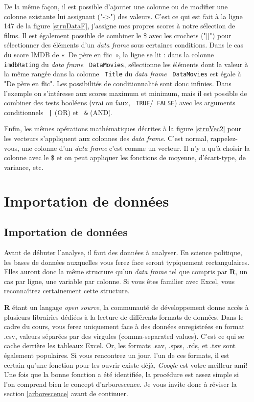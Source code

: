 \documentclass[10.5pt,a4paper]{article}
\newcommand{\rcode}[1]{\texttt{\color{rstudio} #1}}
\begin{document}
    
    De la même façon, il est possible d'ajouter une colonne ou de modifier une colonne existante lui assignant ("->") des valeurs. C'est ce qui est fait à la ligne 147 de la figure \ref{struDataF}, j'assigne mes propres scores à notre sélection de films. Il est également possible de combiner le \$ avec les crochets ("[]") pour sélectionner des éléments d'un \emph{data frame} sous certaines conditions. Dans le cas du score IMDB de «~De père en flic~», la ligne se lit : dans la colonne \rcode{imdbRating} du \emph{data frame} \rcode{DataMovies}, sélectionne les éléments dont la valeur à la même rangée dans la colonne \rcode{Title} du \emph{data frame} \rcode{DataMovies} est égale à "De père en flic". Les possibilités de conditionnalité sont donc infinies. Dans l'exemple on s'intéresse aux scores maximum et minimum, mais il est possible de combiner des tests booléens (vrai ou faux, \rcode{TRUE}/\rcode{FALSE}) avec les arguments conditionnels \rcode{|} (OR) et \rcode{\&} (AND). 
    
    Enfin, les mêmes opérations mathématiques décrites à la figure \ref{struVec2} pour les vecteurs s'appliquent aux colonnes des \emph{data frame}. C'est normal, rappelez-vous, une colonne d'un \emph{data frame} c'est comme un vecteur. Il n'y a qu'à choisir la colonne avec le \$ et on peut appliquer les fonctions de moyenne, d'écart-type, de variance, etc.

  
\section{Importation de données}\label{import}
  \subsection{Importation de données}
  Avant de débuter l'analyse, il faut des données à analyser. En science politique, les bases de données auxquelles vous ferez face seront typiquement rectangulaires. Elles auront donc la même structure qu'un \emph{data frame} tel que compris par \textbf{R}, un cas par ligne, une variable par colonne. Si vous êtes familier avec Excel, vous reconnaîtrez certainement cette structure. 
  
  \textbf{R} étant un langage \emph{open source}, la communauté de développement donne accès à plusieurs librairies dédiées à la lecture de différents formats de données. Dans le cadre du cours, vous ferez uniquement face à des données enregistrées en format .csv, valeurs séparées par des virgules (comma-separated values). C'est ce qui se cache derrière les tableaux Excel. Or, les formats .sav, .spss, .rds, et .tsv sont également populaires. Si vous rencontrez un jour, l'un de ces formats, il est certain qu'une fonction pour les ouvrir existe déjà, \emph{Google} est votre meilleur ami! Une fois que la bonne fonction a été identifiée, la procédure est assez simple si l'on comprend bien le concept d'arborescence. Je vous invite donc à réviser la section \ref{arborescence} avant de continuer. 
  
\end{document}
